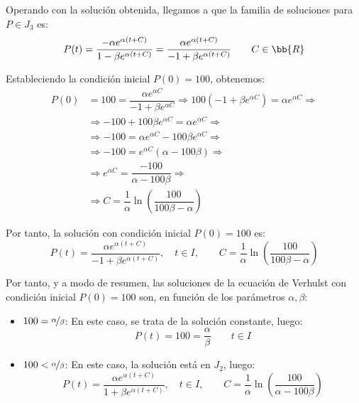 \begin{ejercicio}
\begin{itemize}
        Operando con la solución obtenida, llegamos a que la familia de soluciones para $P\in J_3$ es:
        \begin{equation*}
            P(t) = \dfrac{-\alpha e^{\alpha (t + C)}}{1-\beta e^{\alpha (t + C)}}
            = \dfrac{\alpha e^{\alpha (t + C)}}{-1+\beta e^{\alpha (t + C)}} \qquad C\in \bb{R}
        \end{equation*}

        Estableciendo la condición inicial $P(0)=100$, obtenemos:
        \begin{align*}
            P(0) &= 100 = \dfrac{\alpha e^{\alpha C}}{-1+\beta e^{\alpha C}} \Longrightarrow 100(-1+\beta e^{\alpha C}) = \alpha e^{\alpha C} \Longrightarrow \\ &\Longrightarrow -100 + 100\beta e^{\alpha C} = \alpha e^{\alpha C} \Longrightarrow \\ &\Longrightarrow -100 = \alpha e^{\alpha C} - 100\beta e^{\alpha C} \Longrightarrow \\ &\Longrightarrow -100 = e^{\alpha C}(\alpha - 100\beta) \Longrightarrow \\ &\Longrightarrow e^{\alpha C} = \dfrac{-100}{\alpha - 100\beta} \Longrightarrow \\ &\Longrightarrow C =\dfrac{1}{\alpha} \ln\left(\dfrac{100}{100\beta-\alpha}\right)
        \end{align*}

        Por tanto, la solución con condición inicial $P(0)=100$ es:
        \begin{equation*}
            P(t) = \dfrac{\alpha e^{\alpha (t + C)}}{-1+\beta e^{\alpha (t + C)}}, \quad t\in I, \qquad C=\dfrac{1}{\alpha}\ln\left(\dfrac{100}{100\beta-\alpha}\right)
        \end{equation*}
    \end{itemize}

    Por tanto, y a modo de resumen, las soluciones de la ecuación de Verhulst con condición inicial $P(0)=100$ son, en función de los parámetros $\alpha, \beta$:
    \begin{itemize}
        \item \ul{$100=\nicefrac{\alpha}{\beta}$}: En este caso, se trata de la solución constante, luego:
        \begin{equation*}
            P(t) = 100 = \frac{\alpha}{\beta} \qquad t\in I
        \end{equation*}

        \item \ul{$100<\nicefrac{\alpha}{\beta}$}: En este caso, la solución está en $J_2$, luego:
        \begin{equation*}
            P(t) = \dfrac{\alpha e^{\alpha (t + C)}}{1+\beta e^{\alpha (t + C)}}, \quad t\in I, \qquad C=\dfrac{1}{\alpha}\ln\left(\dfrac{100}{\alpha - 100\beta}\right)
        \end{equation*}


\end{itemize}
\end{ejercicio}
